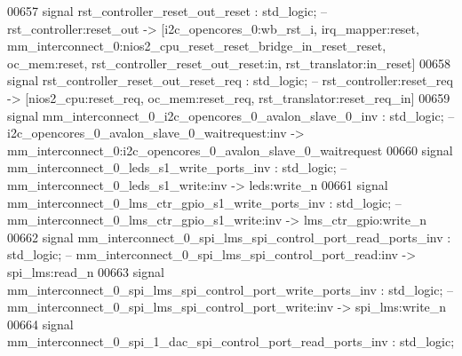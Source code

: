 \begin{DoxyCode}
00657     \textcolor{keywordflow}{signal} \textcolor{vhdlchar}{rst_controller_reset_out_reset}                                              \textcolor{vhdlchar}{:} \textcolor{comment}{std\_logic};\textcolor{keyword}{        
                   -- rst\_controller:reset\_out -> [i2c\_opencores\_0:wb\_rst\_i, irq\_mapper:reset,
       mm\_interconnect\_0:nios2\_cpu\_reset\_reset\_bridge\_in\_reset\_reset, oc\_mem:reset, rst\_controller\_reset\_out\_reset:in,
       rst\_translator:in\_reset]}
00658     \textcolor{keywordflow}{signal} \textcolor{vhdlchar}{rst_controller_reset_out_reset_req}                                          \textcolor{vhdlchar}{:} \textcolor{comment}{std\_logic};\textcolor{keyword}{        
                   -- rst\_controller:reset\_req -> [nios2\_cpu:reset\_req, oc\_mem:reset\_req,
       rst\_translator:reset\_req\_in]}
00659     \textcolor{keywordflow}{signal} \textcolor{vhdlchar}{mm_interconnect_0_i2c_opencores_0_avalon_slave_0_inv}                        \textcolor{vhdlchar}{:} \textcolor{comment}{std\_logic};\textcolor{keyword}{        
                   -- i2c\_opencores\_0\_avalon\_slave\_0\_waitrequest:inv ->
       mm\_interconnect\_0:i2c\_opencores\_0\_avalon\_slave\_0\_waitrequest}
00660     \textcolor{keywordflow}{signal} \textcolor{vhdlchar}{mm_interconnect_0_leds_s1_write_ports_inv}                                   \textcolor{vhdlchar}{:} \textcolor{comment}{std\_logic};\textcolor{keyword}{        
                   -- mm\_interconnect\_0\_leds\_s1\_write:inv -> leds:write\_n}
00661     \textcolor{keywordflow}{signal} \textcolor{vhdlchar}{mm_interconnect_0_lms_ctr_gpio_s1_write_ports_inv}                           \textcolor{vhdlchar}{:} \textcolor{comment}{std\_logic};\textcolor{keyword}{        
                   -- mm\_interconnect\_0\_lms\_ctr\_gpio\_s1\_write:inv -> lms\_ctr\_gpio:write\_n}
00662     \textcolor{keywordflow}{signal} \textcolor{vhdlchar}{mm_interconnect_0_spi_lms_spi_control_port_read_ports_inv}                   \textcolor{vhdlchar}{:} \textcolor{comment}{std\_logic};\textcolor{keyword}{        
                   -- mm\_interconnect\_0\_spi\_lms\_spi\_control\_port\_read:inv -> spi\_lms:read\_n}
00663     \textcolor{keywordflow}{signal} \textcolor{vhdlchar}{mm_interconnect_0_spi_lms_spi_control_port_write_ports_inv}                  \textcolor{vhdlchar}{:} \textcolor{comment}{std\_logic};\textcolor{keyword}{        
                   -- mm\_interconnect\_0\_spi\_lms\_spi\_control\_port\_write:inv -> spi\_lms:write\_n}
00664     \textcolor{keywordflow}{signal} \textcolor{vhdlchar}{mm_interconnect_0_spi_1_dac_spi_control_port_read_ports_inv}                 \textcolor{vhdlchar}{:} \textcolor{comment}{std\_logic};\textcolor{keyword}{        
}
\end{DoxyCode}

